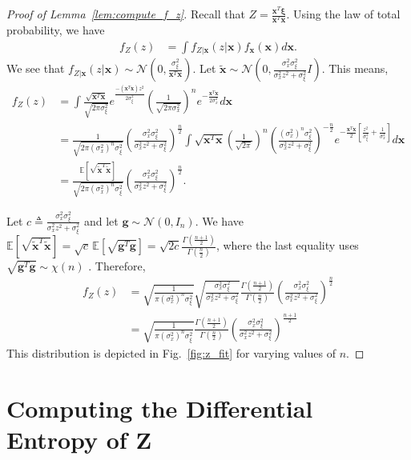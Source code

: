 \documentclass[12pt,onecolumn, margin=1in]{IEEEtran}
\newcommand{\bracket}[1]{\left[ #1 \right]}
\newcommand{\paren}[1]{\left( #1 \right)}
\newcommand{\E}[1]{\mathbb{E}\left[ #1 \right]}
\newcommand{\gauss}[2]{\mathcal{N}\paren{#1, #2}}
\newcommand{\xv}{\mathbf{x}}
\newcommand{\xiv}{\boldsymbol{\xi}}
\newcommand{\sigx}{\sigma_x}
\newcommand{\sigxi}{\sigma_\xi}
\newcommand{\xtx}{\xv^T\xv}
\newcommand{\xt}{\tilde{\xv}}
\newcommand{\xttxt}{\tilde{\xv}^T\tilde{\xv}}
\begin{document}
\begin{proof}[Proof of Lemma~\ref{lem:compute_f_z}]
Recall that $Z = \frac{\xv^T\xiv}{\xtx}$. Using the law of total probability, we have
\begin{align}
    f_{Z}(z) &= \int f_{Z|\xv} (z|\xv)f_\xv(\xv)d\xv.
\end{align}
We see that $f_{Z|\xv} (z|\xv) \sim \gauss{0}{\frac{\sigxi^2}{\xv^T\xv}}$. Let $\xt \sim \gauss{0}{\frac{\sigx^2\sigxi^2}{\sigx^2z^2 + \sigxi^2}I}$. This means,
\begin{align}
    f_{Z}(z) &= \int \frac{\sqrt{\xtx}}{\sqrt{2\pi\sigxi^2}}e^{\frac{-(\xv^T\xv)z^2}{2\sigxi^2}}\paren{\frac{1}{\sqrt{2\pi\sigx^2}}}^ne^{-\frac{\xv^T\xv}{2\sigx^2}} d\xv\\
    &= \frac{1}{\sqrt{2\pi\paren{\sigx^2}^n\sigxi^2}}\paren{\frac{\sigx^2\sigxi^2}{\sigx^2z^2 + \sigxi^2}}^{\frac{n}{2}}\int \sqrt{\xtx}\paren{\frac{1}{\sqrt{2\pi}}}^n \paren{\frac{\paren{\sigx^2}^n\sigxi^2}{\sigx^2z^2 + \sigxi^2}}^{-\frac{n}{2}} e^{-\frac{\xtx}{2}\bracket{\frac{z^2}{\sigxi^2} + \frac{1}{\sigx^2}}}d\xv\\
    &= \frac{\E{\sqrt{\xttxt}}}{\sqrt{2\pi\paren{\sigx^2}^n\sigxi^2}}\paren{\frac{\sigx^2\sigxi^2}{\sigx^2z^2 + \sigxi^2}}^{\frac{n}{2}}.
\end{align}

Let $c \triangleq \frac{\sigx^2\sigxi^2}{\sigx^2z^2 + \sigxi^2}$ and let $\mathbf{g} \sim \mathcal{N}(0, I_n)$. We have $\E{\sqrt{\xttxt}} = \sqrt{c}\,\E{\sqrt{\mathbf{g}^T\mathbf{g}}} = \sqrt{2c}\frac{\Gamma\paren{\frac{n+1}{2}}}{\Gamma\paren{\frac{n}{2}}}$, where the last equality uses $\sqrt{\mathbf{g}^T\mathbf{g}} \sim \chi(n)$ \cite{JohnsonNormanLloyd1994Cud}. Therefore,
\begin{align}
    f_Z(z) &= \sqrt{\frac{1}{\pi\paren{\sigx^2}^n\sigxi^2}}\sqrt{\frac{\sigx^2\sigxi^2}{\sigx^2z^2 + \sigxi^2}}\frac{\Gamma\paren{\frac{n+1}{2}}}{\Gamma\paren{\frac{n}{2}}}\paren{\frac{\sigx^2\sigxi^2}{\sigx^2z^2 + \sigxi^2}}^{\frac{n}{2}}\\
    &= \sqrt{\frac{1}{\pi\paren{\sigx^2}^n\sigxi^2}}\frac{\Gamma\paren{\frac{n+1}{2}}}{\Gamma\paren{\frac{n}{2}}}\paren{\frac{\sigx^2\sigxi^2}{\sigx^2z^2 + \sigxi^2}}^{\frac{n + 1}{2}}\label{eq:f_z_appendix}
\end{align}
This distribution is depicted in Fig.~\ref{fig:z_fit} for varying values of $n$.
\end{proof}


\FloatBarrier
\newpage
\section{Computing the Differential Entropy of Z}\label{sec:compute_h_z}
\end{document}
